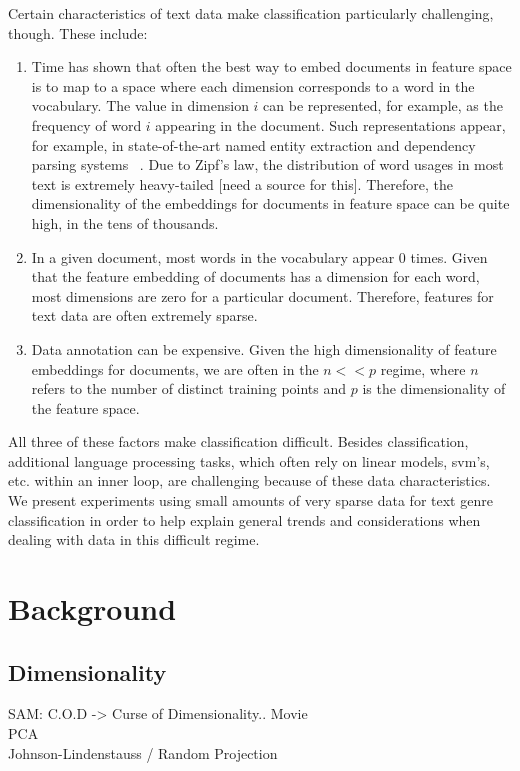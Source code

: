 \documentclass[]{article}
\begin{document}
Certain characteristics of text data make classification particularly challenging, though. These include:
\begin{enumerate}
\item Time has shown that often the best way to embed documents in feature space is to map to a space where each dimension corresponds to a word in the vocabulary. The value in dimension $i$ can be represented, for example, as the frequency of word $i$ appearing in the document. Such representations appear, for example, in state-of-the-art named entity extraction and dependency parsing systems ~\cite{ratinov2009design,nivre2004deterministic}. Due to Zipf's law, the distribution of word usages in most text is extremely heavy-tailed [need a source for this]. Therefore, the dimensionality of the embeddings for documents in feature space can be quite high, in the tens of thousands. 
\item  In a given document, most words in the vocabulary appear 0 times. Given that the feature embedding of documents has a dimension for each word, most dimensions are zero for a particular document. Therefore, features for text data are often extremely sparse. 
\item Data annotation can be expensive. Given the high dimensionality of feature embeddings for documents, we are often in the $n << p$ regime, where $n$ refers to the number of distinct training points and $p$ is the dimensionality of the feature space. 
\end{enumerate}

All three of these factors make classification difficult. Besides classification, additional language processing tasks, which often rely on linear models, svm's, etc. within an inner loop, are challenging because of these data characteristics.  We present experiments  using small amounts of very sparse data for text genre classification in order to help explain general trends and considerations when dealing with data in this difficult regime. 

\section{Background}
\subsection{Dimensionality}
SAM: C.O.D -> Curse of Dimensionality.. Movie \\
	PCA\\
           Johnson-Lindenstauss / Random Projection \\
\end{document}
